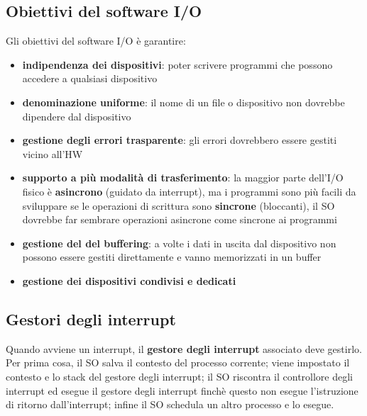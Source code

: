\documentclass[12pt]{article}
\begin{document}
\subsection{Obiettivi del software I/O}
Gli obiettivi del software I/O è garantire:
\begin{itemize}
    \item \textbf{indipendenza dei dispositivi}: poter scrivere programmi che possono accedere a qualsiasi dispositivo
    \item \textbf{denominazione uniforme}: il nome di un file o dispositivo non dovrebbe dipendere dal dispositivo 
    \item \textbf{gestione degli errori trasparente}: gli errori dovrebbero essere gestiti vicino all'HW 
    \item \textbf{supporto a più modalità di trasferimento}: la maggior parte dell'I/O fisico è \textbf{asincrono} (guidato 
    da interrupt), ma i programmi sono più facili da sviluppare se le operazioni di scrittura sono \textbf{sincrone} (bloccanti), 
    il SO dovrebbe far sembrare operazioni asincrone come sincrone ai programmi
    \item \textbf{gestione del del buffering}: a volte i dati in uscita dal dispositivo non possono essere gestiti direttamente 
    e vanno memorizzati in un buffer
    \item \textbf{gestione dei dispositivi condivisi e dedicati}
\end{itemize} 
\subsection{Gestori degli interrupt}
Quando avviene un interrupt, il \textbf{gestore degli interrupt} associato deve gestirlo. Per prima cosa, il SO salva il 
contesto del processo corrente; viene impostato il contesto e lo stack del gestore degli interrupt; il SO riscontra il 
controllore degli interrupt ed esegue il gestore degli interrupt finchè questo non esegue l'istruzione di ritorno dall'interrupt; 
infine il SO schedula un altro processo e lo esegue.
\end{document}
